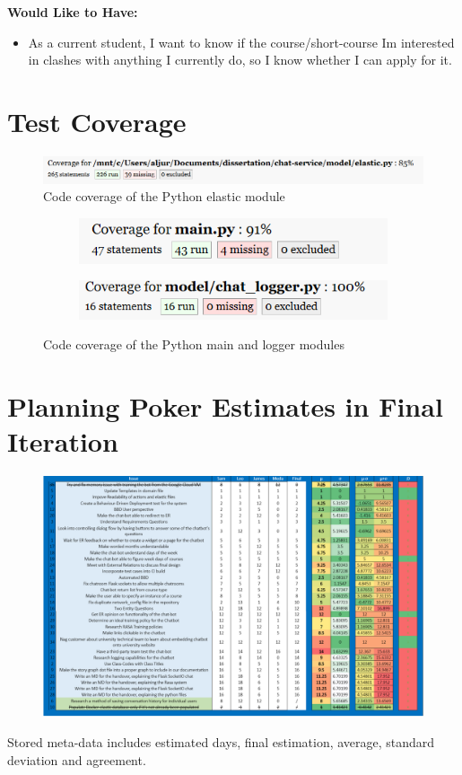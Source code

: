 \documentclass{l3proj}
\begin{document}
\textbf{Would Like to Have:}
\begin{itemize}
\item As a current student, I want to know if the course/short-course I\textsc{}m interested in clashes with anything I currently do, so I know whether I can apply for it.
\end{itemize}

\smallskip
\section{Test Coverage}
\label{apdx:coverage}

\begin{figure}[h]
    \centering
    \includegraphics[width=0.85\linewidth]{figures/Unit_Testing_1.PNG}
    \caption{Code coverage of the Python elastic module}
\end{figure}

\begin{figure}[h]
  \centering
  \begin{subfigure}[b]{0.425\linewidth}
    \includegraphics[width=\linewidth]{figures/Unit_Testing_2.PNG}
  \end{subfigure}
  \begin{subfigure}[b]{0.425\linewidth}
    \includegraphics[width=\linewidth]{figures/Unit_Testing_3.PNG}
  \end{subfigure}
  \caption{Code coverage of the Python main and logger modules}
\end{figure}

\section{Planning Poker Estimates in Final Iteration}
\label{apdx:pp}

\begin{figure}[h!]
    \centering
    \includegraphics[width=0.85\linewidth]{figures/ppiteration6.PNG}
\end{figure}

Stored meta-data includes estimated days, final estimation, average, standard deviation and agreement.
\end{document}
